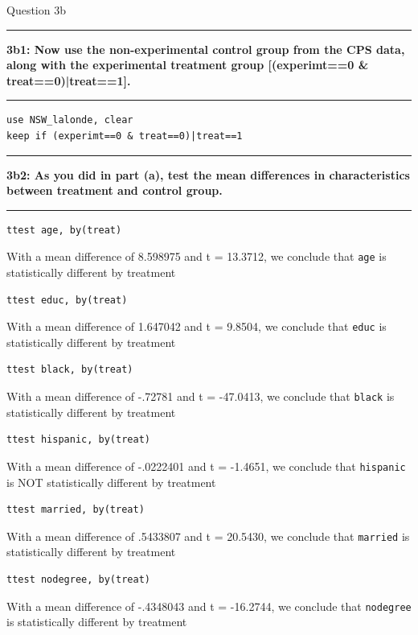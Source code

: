 \documentclass[12pt]{article}
\newcommand\question[2]{\vspace{1em}\hrule\vspace{1em}\textbf{#1: #2}\vspace{1em}\hrule\vspace{1em}}
\begin{document}
\begin{center}\LARGE{Question 3b}\end{center}

\question{3b1}{ Now use the non-experimental control group from the CPS data, along with the experimental treatment group [(experimt==0 \& treat==0)|treat==1].  }
\begin{lstlisting}
use NSW_lalonde, clear
keep if (experimt==0 & treat==0)|treat==1
\end{lstlisting}

\question{3b2}{As you did in part (a), test the mean differences in characteristics between treatment and control group.  }
\begin{lstlisting}
ttest age, by(treat)
\end{lstlisting}
With a mean difference of  8.598975  and t =   13.3712, we conclude that \verb|age| is  statistically different by treatment

\begin{lstlisting}
ttest educ, by(treat)
\end{lstlisting}
With a mean difference of  1.647042  and t =   9.8504, we conclude that \verb|educ| is statistically different by treatment

\begin{lstlisting}
ttest black, by(treat)
\end{lstlisting}
With a mean difference of   -.72781  and t =  -47.0413, we conclude that \verb|black| is  statistically different by treatment

\begin{lstlisting}
ttest hispanic, by(treat) 
\end{lstlisting}
With a mean difference of -.0222401   and t =    -1.4651, we conclude that \verb|hispanic| is NOT statistically different by treatment

\begin{lstlisting}
ttest married, by(treat)
\end{lstlisting}
With a mean difference of  .5433807  and t = 20.5430, we conclude that \verb|married| is  statistically different by treatment

\begin{lstlisting}
ttest nodegree, by(treat)
\end{lstlisting}
With a mean difference of  -.4348043  and t =   -16.2744, we conclude that \verb|nodegree| is  statistically different by treatment
\end{document}
